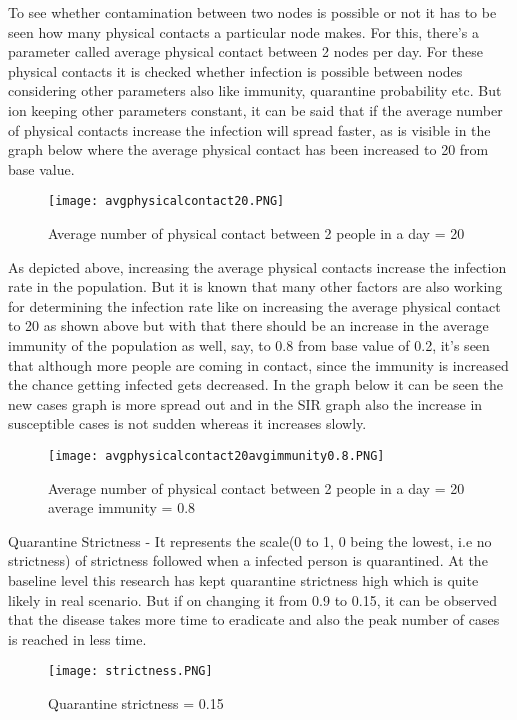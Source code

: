 \documentclass[conference]{IEEEtran}
\begin{document}
            To see whether contamination between two nodes is possible or not it has to be seen how many physical contacts a particular node makes. For this, there's a parameter called average physical contact between 2 nodes per day. For these physical contacts it is checked whether infection is possible between nodes considering other parameters also like immunity, quarantine probability etc. But ion keeping other parameters constant, it can be said that if the average number of physical contacts increase the infection will spread faster, as is visible in the graph below where the average physical contact has been increased to 20 from base value.\\
             \begin{figure}[!h]
        		\texttt{[image: avgphysicalcontact20.PNG]}
        		\caption{Average number of physical contact between 2 people in a day = 20}
            \end{figure}
    
    As depicted above, increasing the average physical contacts increase the infection rate in the population. But it is known that many other factors are also working for determining the infection rate like on increasing the average physical contact to 20 as shown above but with that there should be an increase in the average immunity of the population as well, say, to 0.8 from base value of 0.2, it's seen that although more people are coming in contact, since the immunity is increased the chance getting infected gets decreased. In the graph below it can be seen the new cases graph is more spread out and in the SIR graph also the increase in susceptible cases is not sudden whereas it increases slowly.\\
    \begin{figure}[!h]
		\texttt{[image: avgphysicalcontact20avgimmunity0.8.PNG]}
		\caption{Average number of physical contact between 2 people in a day = 20 average immunity = 0.8}
    \end{figure}
    
    Quarantine Strictness - It represents the scale(0 to 1, 0 being the lowest, i.e no strictness) of strictness followed when a infected person is quarantined. At the baseline level this research has kept quarantine strictness high which is quite likely in real scenario. But if on changing it from 0.9 to 0.15, it can be observed that the disease takes more time to eradicate and also the peak number of cases is reached in less time.\\
    \begin{figure}[!h]
		\texttt{[image: strictness.PNG]}
		\caption{Quarantine strictness = 0.15}
    \end{figure}
    
\end{document}
